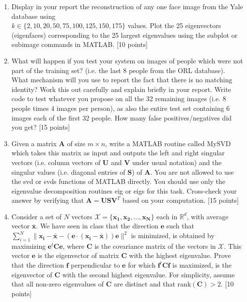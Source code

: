 \documentclass[11pt]{article}
\begin{document}
\begin{enumerate}
\item Display in your report the reconstruction of any one face image from the Yale database using \\ $k \in \{2,10,20,50,75,100,125, 150,175\}$ values. Plot the 25 eigenvectors (eigenfaces) corresponding to the 25 largest eigenvalues using the subplot or subimage commands in MATLAB. \textsf{[10 points]}

\item What will happen if you test your system on images of people which were not part of the training set? (i.e. the last 8 people from the ORL database). What mechanism will you use to report the fact that there is no matching identity? Work this out carefully and explain briefly in your report. Write code to test whatever you propose on all the 32 remaining images (i.e. 8 people times 4 images per person), as also the entire test set containing 6 images each of the first 32 people. How many false positives/negatives did you get? \textsf{[15 points]}

\item Given a matrix $\boldsymbol{A}$ of size $m \times n$, write a MATLAB routine called MySVD which takes this matrix as input and outputs the left and right singular vectors (i.e. column vectors of $\boldsymbol{U}$ and $\boldsymbol{V}$ under usual notation) and the singular values (i.e. diagonal entries of $\boldsymbol{S}$) of $\boldsymbol{A}$. You are not allowed to use the \textsf{svd} or \textsf{svds} functions of MATLAB directly. You should use only the eigenvalue decomposition routines \textsf{eig} or \textsf{eigs} for this task. Cross-check your answer by verifying that $\boldsymbol{A} = \boldsymbol{USV}^T$ based on your computation. \textsf{[15 points]}

\item Consider a set of $N$ vectors $\mathcal{X} = \{\boldsymbol{x_1}, \boldsymbol{x_2}, ..., \boldsymbol{x_N}\}$ each in $\mathbb{R}^d$, with average vector $\boldsymbol{\bar{x}}$. We have seen in class that the direction $\boldsymbol{e}$ such that $\sum_{i=1}^N \|\boldsymbol{x_i}-\boldsymbol{\bar{x}}-(\boldsymbol{e} \cdot (\boldsymbol{x_i}-\boldsymbol{\bar{x}}))\boldsymbol{e}\|^2$ is minimized, is obtained by maximizing $\boldsymbol{e}^t \boldsymbol{C} \boldsymbol{e}$, where $\boldsymbol{C}$ is the covariance matrix of the vectors in $\mathcal{X}$. This vector $\boldsymbol{e}$ is the eigenvector of matrix $\boldsymbol{C}$ with the highest eigenvalue. Prove that the direction $\boldsymbol{f}$ perpendicular to $\boldsymbol{e}$ for which $\boldsymbol{f}^t \boldsymbol{C} \boldsymbol{f}$ is maximized, is the eigenvector of $\boldsymbol{C}$ with the second highest eigenvalue. For simplicity, assume that all non-zero eigenvalues of $\boldsymbol{C}$ are distinct and that $\textrm{rank}(\boldsymbol{C}) > 2$. \textsf{[10 points]}


\end{enumerate}
\end{document}
